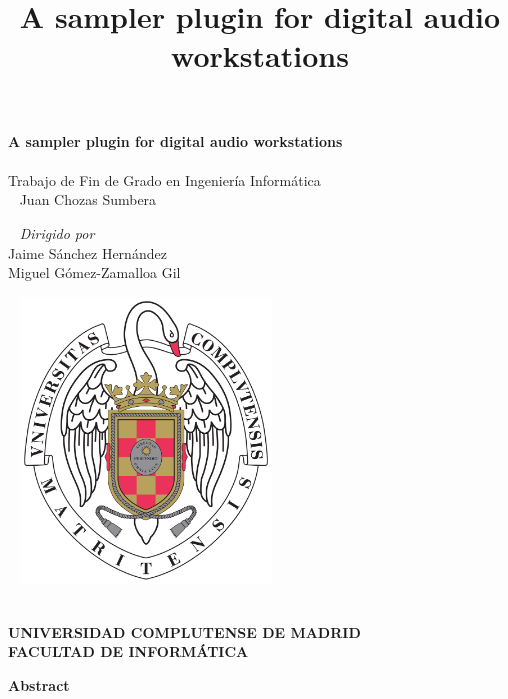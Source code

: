 \documentclass[12pt, a4paper, hidelinks]{report}
\title{\textbf{A sampler plugin for digital audio workstations}}
\date{\vspace{-10ex}}
\begin{document}
	\begin{center}
		\textbf{\huge{A sampler plugin for digital audio workstations}}\\
		~\\
		
		Trabajo de Fin de Grado en Ingeniería Informática\\
		
		~\newline
		\large{Juan Chozas Sumbera}
		
		\normalsize
		~\newline
		\textit{Dirigido por\\}
		\large
		Jaime Sánchez Hernández\\
			Miguel Gómez-Zamalloa Gil
		
		\normalsize
		~\newline
		\includegraphics[width=0.5\textwidth]{logo_UCM.png}\\
		~\newline
		
		\textbf{\large{UNIVERSIDAD COMPLUTENSE DE MADRID}}\\
		
		\textbf{FACULTAD DE INFORMÁTICA}
	\end{center}
	
	
	
	\newpage
	
	
	\newpage
	\huge
	\textbf{Abstract}\\
	
\end{document}
